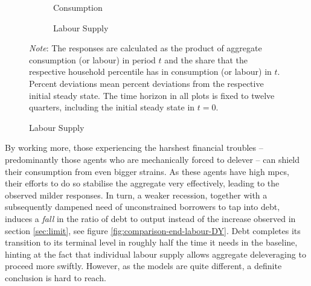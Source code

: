 \documentclass[a4paper,12pt]{article} %
\numberwithin{equation}{section} %
\numberwithin{figure}{section}
\numberwithin{table}{section}
\begin{document}
\begin{figure}[t]
    \centering
    \caption{Endogenous Labour Model -- Shock to Borrowing Limit: \\ Consumption and Labour Responses by Percentiles}
    \label{fig:end-L-permanent-limit-percentiles}
    \begin{subfigure}[b]{0.49\textwidth}
    \caption{Consumption}
    \label{fig:end-L-permanent-limit-percentiles-c}
         \centering
         
     \end{subfigure}
     \hfill
    \begin{subfigure}[b]{0.49\textwidth}
    \caption{Labour Supply}
    \label{fig:end-L-permanent-limit-percentiles-n}
         \centering
         
     \end{subfigure}
     
     \vspace{10pt}
     
     \justifying
     \footnotesize
	\textit{Note}: The responses are calculated as the product of aggregate consumption (or labour) in period $t$ and the share that the respective household percentile has in consumption (or labour) in $t$. Percent deviations mean percent deviations from the respective initial steady state. The time horizon in all plots is fixed to twelve quarters, including the initial steady state in $t=0$.
\end{figure}

By working more, those experiencing the harshest financial troubles -- predominantly those agents who are mechanically forced to delever -- can shield their consumption from even bigger strains. As these agents have high \Gls{mpc}s, their efforts to do so stabilise the aggregate very effectively, leading to the observed milder responses. In turn, a weaker recession, together with a subsequently dampened need of unconstrained borrowers to tap into debt, induces a \textit{fall} in the ratio of debt to output instead of the increase observed in section \ref{sec:limit}, see figure \ref{fig:comparison-end-labour-DY}. Debt completes its transition to its terminal level in roughly half the time it needs in the baseline, hinting at the fact that individual labour supply allows aggregate deleveraging to proceed more swiftly. However, as the models are quite different, a definite conclusion is hard to reach.
\end{document}
